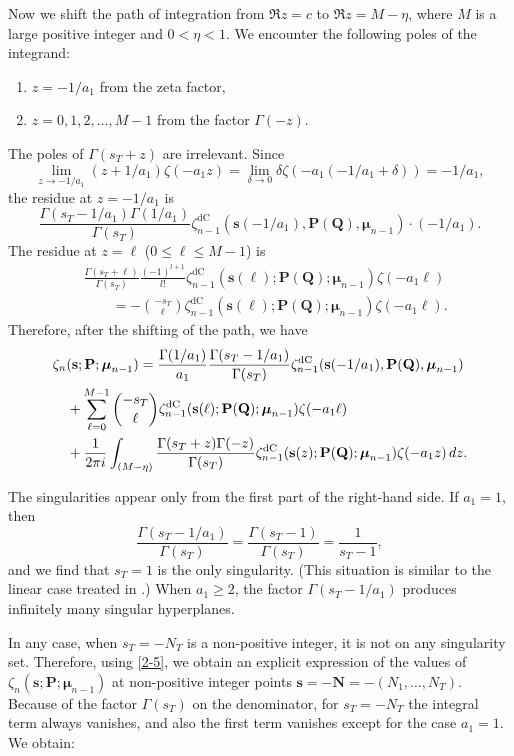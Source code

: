 \documentclass[a4paper,12pt]{article}
\theoremstyle{definition}
\numberwithin{equation}{section}
\newcommand{\dc}{\mathrm{dC}}
\newcommand{\dd}{d}
\newcommand{\ii}{i}
\begin{document}
Now we shift the path of integration from $\Re z=c$ to $\Re z=M-\eta$, where $M$ is
a large positive integer and $0<\eta<1$.    We encounter the following poles of the integrand:
\begin{enumerate}[label=(\roman*)]
\item $z=-1/a_1$ from the zeta factor,
\item $z=0,1,2,\ldots,M-1$ from the factor $\Gamma(-z)$.
\end{enumerate}
The poles of $\Gamma(s_T+z)$ are irrelevant.
Since
$$
\lim_{z\to -1/a_1}(z+1/a_1)\zeta(-a_1z)=\lim_{\delta\to 0}\delta\zeta(-a_1(-1/a_1+\delta))=-1/a_1,
$$
the residue at $z=-1/a_1$ is
$$
\frac{\Gamma (s_T-1/a_1)\Gamma(1/a_1)}{\Gamma(s_T)}\zeta_{n-1}^{\dc}(\mathbf{s}(-1/a_1),\mathbf{P(Q)},
\boldsymbol{\mu}_{n-1})\cdot (-1/a_1).
$$
The residue at $z=\ell$ ($0\leq\ell\leq M-1$) is
\begin{align*}
&\frac{\Gamma(s_T+\ell)}{\Gamma(s_T)}\frac{(-1)^{l+1}}{l!}
\zeta_{n-1}^{\dc}(\mathbf{s}(\ell);\mathbf{P(Q)};\boldsymbol{\mu}_{n-1})\zeta(-a_1\ell)\\
&\qquad=-\binom{-s_T}{\ell}\zeta_{n-1}^{\dc}(\mathbf{s}(\ell);\mathbf{P(Q)};\boldsymbol{\mu}_{n-1})\zeta(-a_1\ell).
\end{align*}
Therefore, after the shifting of the path, we have
\begin{align}\label{2-5}
&\zeta_n(\mathbf{s};\mathbf{P};\boldsymbol{\mu}_{n-1})
=\frac{\Gamma(1/a_1)}{a_1}\frac{\Gamma (s_T-1/a_1)}{\Gamma(s_T)}\zeta_{n-1}^{\dc}(\mathbf{s}(-1/a_1),\mathbf{P(Q)},
\boldsymbol{\mu}_{n-1})\notag\\
&\quad +\sum_{\ell=0}^{M-1}\binom{-s_T}{\ell}\zeta_{n-1}^{\dc}(\mathbf{s}(\ell);\mathbf{P(Q)};\boldsymbol{\mu}_{n-1})\zeta(-a_1\ell)
\notag\\
&\quad+\frac{1}{2\pi \ii}\int_{(M-\eta)}
\frac{\Gamma(s_T+z)\Gamma(-z)}{\Gamma(s_T)}
\zeta_{n-1}^{\dc}(\mathbf{s}(z);\mathbf{P(Q)};\boldsymbol{\mu}_{n-1})\zeta(-a_1z) \, \dd z.
\end{align}

The singularities appear only from the first part of 
the right-hand side.
If $a_1=1$, then
$$
\frac{\Gamma(s_T-1/a_1)}{\Gamma(s_T)}=\frac{\Gamma(s_T-1)}{\Gamma(s_T)}=\frac{1}{s_T-1},
$$
and we find that $s_T=1$ is the only singularity.    (This situation is similar to
the linear case treated in \cite{CMUSP}.)
When $a_1\geq 2$, the factor $\Gamma(s_T-1/a_1)$ produces infinitely many singular
hyperplanes.

In any case, when $s_T=-N_T$ is a non-positive integer, it is not on any singularity set.
Therefore, using \eqref{2-5}, we obtain an explicit expression of the values of
$\zeta_n(\mathbf{s};\mathbf{P};\boldsymbol{\mu}_{n-1})$ at non-positive integer points 
$\mathbf{s}=-\mathbf{N}=-(N_1,\ldots,N_T)$.
Because of the factor $\Gamma(s_T)$ on the denominator, for $s_T=-N_T$ the integral term always vanishes, and also
the first term vanishes except for the case $a_1=1$.
We obtain:
\end{document}
